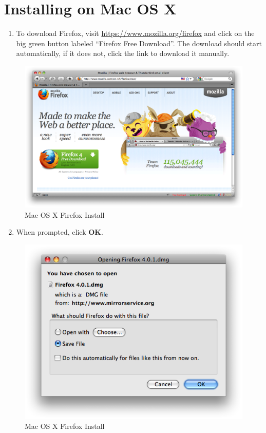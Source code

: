\section{Installing on Mac OS X}

\begin{enumerate}[1.]
\item
  To download Firefox, visit
  \href{https://www.mozilla.org/firefox}{https://www.mozilla.org/firefox}
  and click on the big green button labeled ``Firefox Free Download''.
  The download should start automatically, if it does not, click the
  link to download it manually.
\end{enumerate}
\begin{figure}[htbp]
\centering
\includegraphics{ff_mac_inst_1.png}
\caption{Mac OS X Firefox Install}
\end{figure}

\begin{enumerate}[1.]
\setcounter{enumi}{1}
\item
  When prompted, click \textbf{OK}.
\end{enumerate}
\begin{figure}[htbp]
\centering
\includegraphics{ff_mac_inst_2.png}
\caption{Mac OS X Firefox Install}
\end{figure}

